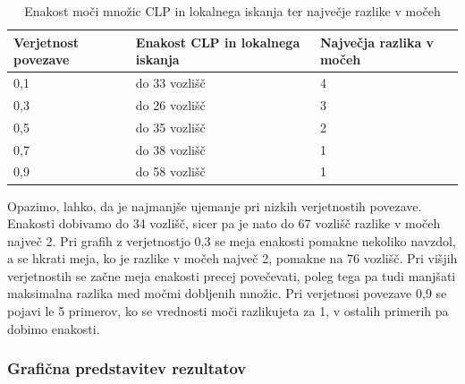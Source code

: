 \documentclass[a4paper, 12 pt]{article}
\theoremstyle{definition}
\theoremstyle{plain}
\theoremstyle{remark}
\begin{document}
\begin{table}[H]
\centering
\begin{tabular}{|p{2.1cm}|p{3.7cm}|p{3.5cm}|}
\hline
\textbf{Verjetnost povezave}  & \textbf{Enakost CLP in lokalnega iskanja} & \textbf{Največja razlika v močeh} \\ \hline
0,1    & do 33 vozlišč &  4\\ \hline
0,3    & do 26 vozlišč  &  3   \\ \hline
0,5    & do 35 vozlišč &  2 \\ \hline
0,7    & do 38 vozlišč  &  1\\ \hline
0,9    & do 58 vozlišč  &  1  \\ \hline
\end{tabular}
\caption{Enakost moči množic CLP in lokalnega iskanja ter največje razlike v močeh}
\label{fig:enakost vseh treh} 
\end{table}

Opazimo, lahko, da je najmanjše ujemanje pri nizkih verjetnostih povezave. Enakosti dobivamo do 34 vozlišč, sicer pa je nato do 67 vozlišč razlike v močeh največ 2. Pri grafih z verjetnostjo 0,3 se meja enakosti pomakne nekoliko navzdol, a se hkrati meja, ko je razlike v močeh največ 2, pomakne na 76 vozlišč. Pri višjih verjetnostih se začne meja enakosti precej povečevati, poleg tega pa tudi manjšati maksimalna razlika med močmi dobljenih množic. Pri verjetnosi povezave 0,9 se pojavi le 5 primerov, ko se vrednosti moči razlikujeta za 1, v ostalih primerih pa dobimo enakosti.

\subsubsection{Grafična predstavitev rezultatov}
\end{document}
